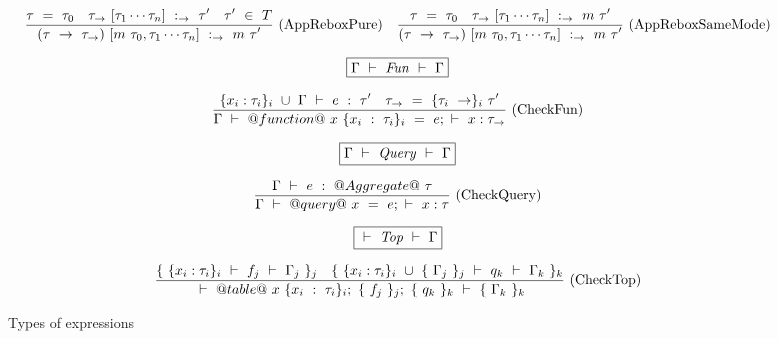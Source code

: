 \begin{figure*}
$$
\enskip \frac {\displaystyle 
  \tau~=~\tau_0
  \quad
  \tau_\to~[\tau_1 \cdots \tau_n]~:_\to~\tau'
  \quad
  \tau'~\in~T
} {\displaystyle 
  (\tau~\to~\tau_\to)~[m~\tau_0, \tau_1 \cdots \tau_n]~:_\to~m~\tau'
} \  \mbox{(AppReboxPure)} \enskip
\enskip \frac {\displaystyle 
  \tau~=~\tau_0
  \quad
  \tau_\to~[\tau_1 \cdots \tau_n]~:_\to~m~\tau'
} {\displaystyle 
  (\tau~\to~\tau_\to)~[m~\tau_0, \tau_1 \cdots \tau_n]~:_\to~m~\tau'
} \  \mbox{(AppReboxSameMode)} \enskip
$$

$$
\boxed{\Gamma ~\vdash~ \mathit{Fun} ~\vdash~ \Gamma}
$$

$$
\enskip \frac {\displaystyle 
  \{x_i:\tau_i\}_i~\cup~\Gamma ~\vdash~ e~:~\tau'
  \quad
  \tau_\to~=~\{\tau_i~\to\}_i~\tau'
} {\displaystyle 
  \Gamma ~\vdash~ @function@~x~\{x_i~:~\tau_i\}_i~=~e; ~\vdash~ x:\tau_\to
} \  \mbox{(CheckFun)} \enskip
$$

$$
\boxed{\Gamma ~\vdash~ \mathit{Query} ~\vdash~ \Gamma}
$$

$$
\enskip \frac {\displaystyle 
  \Gamma ~\vdash~ e~:~@Aggregate@~\tau
} {\displaystyle 
  \Gamma ~\vdash~ @query@~x~=~e; ~\vdash~ x:\tau
} \  \mbox{(CheckQuery)} \enskip
$$

$$
\boxed{ ~\vdash~ \mathit{Top} ~\vdash~ \Gamma}
$$

$$
\enskip \frac {\displaystyle 
  \{~\{x_i:\tau_i\}_i ~\vdash~ f_j ~\vdash~ \Gamma_j~\}_j
  \quad
  \{~\{x_i:\tau_i\}_i~\cup~\{~\Gamma_j~\}_j ~\vdash~ q_k ~\vdash~ \Gamma_k~\}_k
} {\displaystyle 
   ~\vdash~ 
      @table@
      ~x~\{x_i~:~\tau_i\}_i;
      ~\{~f_j~\}_j;
      ~\{~q_k~\}_k
     ~\vdash~ \{~\Gamma_k~\}_k
} \  \mbox{(CheckTop)} \enskip
$$


\caption{Types of expressions}
\label{fig:source:type:exp}
\end{figure*}

